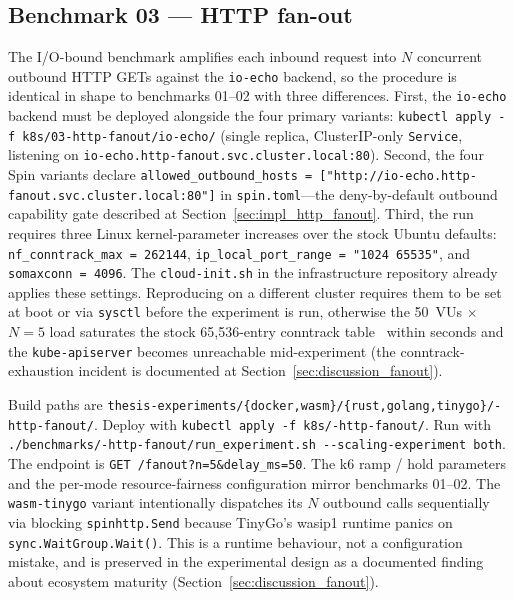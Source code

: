 \subsection{Benchmark 03 --- HTTP fan-out}
\label{sec:repro_workflow_03}

\begin{sloppypar}
The I/O-bound benchmark amplifies each inbound request into $N$ concurrent outbound \acs{HTTP} GETs against the \texttt{io-echo} backend, so the procedure is identical in shape to benchmarks 01--02 with three differences. First, the \texttt{io-echo} backend must be deployed alongside the four primary variants: \texttt{kubectl apply -f k8s/03-http-fanout/io-echo/} (single replica, ClusterIP-only \texttt{Service}, listening on \texttt{io-echo.http-fanout.svc.cluster.local:80}). Second, the four Spin variants declare \texttt{allowed\_outbound\_hosts = ["http://io-echo.http-fanout.svc.cluster.local:80"]} in \texttt{spin.toml}---the deny-by-default outbound capability gate described at Section~\ref{sec:impl_http_fanout}. Third, the run requires three Linux kernel-parameter increases over the stock Ubuntu defaults: \texttt{nf\_conntrack\_max~=~262144}, \texttt{ip\_local\_port\_range~=~"1024 65535"}, and \texttt{somaxconn~=~4096}. The \texttt{cloud-init.sh} in the infrastructure repository already applies these settings. Reproducing on a different cluster requires them to be set at boot or via \texttt{sysctl} before the experiment is run, otherwise the 50~\acp{VU} $\times$ $N=5$ load saturates the stock 65,536-entry conntrack table~\cite{linux2024conntrack} within seconds and the \texttt{kube-apiserver} becomes unreachable mid-experiment (the conntrack-exhaustion incident is documented at Section~\ref{sec:discussion_fanout}).
\end{sloppypar}

\begin{sloppypar}
Build paths are \texttt{thesis-experiments/\allowbreak\{docker,wasm\}/\allowbreak\{rust,golang,tinygo\}/-http-fanout/}. Deploy with \texttt{kubectl apply -f k8s/-http-fanout/}. Run with \texttt{./benchmarks/-http-fanout/\allowbreak run\_experiment.sh\allowbreak{} -{}-scaling-experiment both}. The endpoint is \texttt{GET /fanout?n=5\&delay\_ms=50}. The k6 ramp / hold parameters and the per-mode resource-fairness configuration mirror benchmarks 01--02. The \texttt{wasm-tinygo} variant intentionally dispatches its $N$ outbound calls sequentially via blocking \texttt{spinhttp.Send} because TinyGo's wasip1 runtime panics on \texttt{sync.WaitGroup.Wait()}. This is a runtime behaviour, not a configuration mistake, and is preserved in the experimental design as a documented finding about ecosystem maturity (Section~\ref{sec:discussion_fanout}).
\end{sloppypar}

